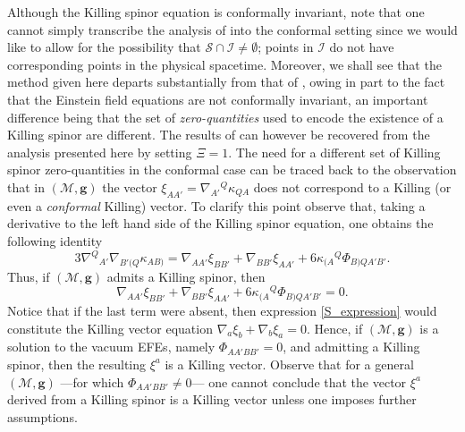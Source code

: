 \documentclass[10pt,a4paper]{article}
\theoremstyle{plain}
\def\bmg{{\bm g}}
\begin{document}
Although the Killing spinor equation is conformally invariant, note that one cannot simply transcribe the analysis of \cite{GarVal08c,
  BaeVal10b} into the conformal setting since we would like to allow for the possibility that $\mathcal{S}\cap\mathscr{I}\neq \emptyset$; points in $\mathscr{I}$ do not have corresponding points in the physical spacetime.
Moreover, we shall see that the method given here departs substantially from that of \cite{GarVal08c,
  BaeVal10b}, owing in part to the fact that the Einstein field
equations are not conformally invariant, an important difference being that the set of
\emph{zero-quantities} used to encode the existence of a Killing spinor are different. The results of
\cite{GarVal08c} can however be recovered from the analysis presented here by
setting $\Xi = 1$. The need for a different
set of Killing spinor zero-quantities in the
conformal case can be traced back to the observation that in
$(\mathcal{M},\bmg)$ the vector
$\xi_{AA'}=\nabla_{A'}{}^{Q}\kappa_{QA}$ does not correspond to a Killing (or even a \emph{conformal} Killing) vector. To clarify this point observe that,
    taking a derivative to the left hand side of the Killing spinor
    equation,  %
    one obtains the following identity
\begin{equation}\label{S_expression}
  3\nabla^{Q}{}_{A'}\nabla_{B'(Q}\kappa_{AB)} = \nabla_{AA'}\xi_{BB'}
  + \nabla_{BB'}\xi_{AA'} + 6\kappa_{(A}{}^{Q}\Phi_{B)QA'B'}.
  \end{equation}\label{S_expression}
Thus, if $(\mathcal{M},\bmg)$ admits a Killing spinor, then
\begin{equation}\label{S_expression}
\nabla_{AA'}\xi_{BB'} + \nabla_{BB'}\xi_{AA'} +
6\kappa_{(A}{}^{Q}\Phi_{B)QA'B'}=0.
\end{equation}
Notice that if the last term were absent, then expression
\eqref{S_expression} would constitute the Killing vector equation
$\nabla_{a}\xi_b +\nabla_b\xi_a=0$. Hence, if $(\mathcal{M},\bmg)$ is a
solution to the vacuum EFEs, namely $\Phi_{AA'BB'}=0$, and admitting a Killing spinor,
then the resulting $\xi^a$ is a Killing vector. Observe that for a general $(\mathcal{M},\bmg)$
---for which $\Phi_{AA'BB'}\neq 0$--- one
cannot conclude that the vector $\xi^a$ derived from a Killing spinor is a Killing vector unless one imposes
further assumptions. 
\\
\end{document}
